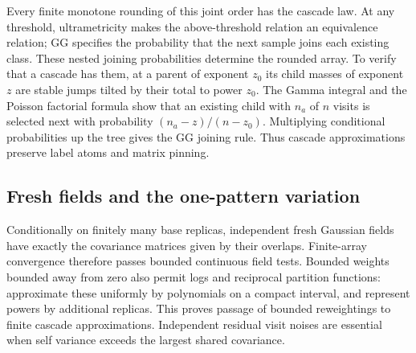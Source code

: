 \documentclass[11pt]{article}
\numberwithin{equation}{section}
\theoremstyle{definition}
\begin{document}
Every finite monotone rounding of this joint order has the cascade law. At any threshold, ultrametricity makes the above-threshold relation an equivalence relation; GG specifies the probability that the next sample joins each existing class. These nested joining probabilities determine the rounded array. To verify that a cascade has them, at a parent of exponent $z_0$ its child masses of exponent $z$ are stable jumps tilted by their total to power $z_0$. The Gamma integral and the Poisson factorial formula show that an existing child with $n_a$ of $n$ visits is selected next with probability $(n_a-z)/(n-z_0)$. Multiplying conditional probabilities up the tree gives the GG joining rule. Thus cascade approximations preserve label atoms and matrix pinning.

\subsection{Fresh fields and the one-pattern variation}
Conditionally on finitely many base replicas, independent fresh Gaussian fields have exactly the covariance matrices given by their overlaps. Finite-array convergence therefore passes bounded continuous field tests. Bounded weights bounded away from zero also permit logs and reciprocal partition functions: approximate these uniformly by polynomials on a compact interval, and represent powers by additional replicas. This proves passage of bounded reweightings to finite cascade approximations. Independent residual visit noises are essential when self variance exceeds the largest shared covariance.
\end{document}
